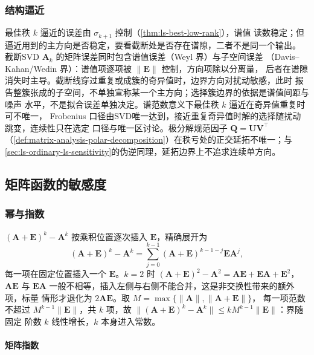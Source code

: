 \subsubsection{结构逼近}
\label{sec:ls-structured-approximation-sensitivity}

最佳秩 $k$ 逼近的误差由 $\sigma_{k+1}$ 控制（\ref{thm:ls-best-low-rank}），谱值
读数稳定；但逼近用到的主方向是否稳定，要看截断处是否存在谱隙，二者不是同一个输出。
截断SVD $\bm A_k$ 的矩阵误差同时包含谱值误差（Weyl 界）与子空间误差
（Davis--Kahan/Wedin 界）：谱值项逐项被 $\lVert\bm E\rVert$ 控制，方向项除以分离量，
后者在谱隙消失时主导。截断线穿过重复或成簇的奇异值时，边界方向对扰动敏感，此时
报告整簇张成的子空间，不单独宣称某一个主方向；选择簇边界的依据是谱值间距与噪声
水平，不是拟合误差单独决定。谱范数意义下最佳秩 $k$ 逼近在奇异值重复时可不唯一，
Frobenius 口径由SVD唯一达到，接近重复奇异值时解的选择随扰动跳变，连续性只在选定
口径与唯一区讨论。极分解规范因子 $\bm Q=\bm U\bm V^\top$
（\ref{def:matrix-analysis-polar-decomposition}）在秩亏处的正交延拓不唯一；与
\ref{sec:ls-ordinary-ls-sensitivity}的伪逆同理，延拓边界上不追求连续单方向。

\subsection{矩阵函数的敏感度}
\label{sec:ls-matrix-function-sensitivity}
\label{sec:linear-algebra-matrix-function-stability}
\label{sec:ch06-matrix-function-stability}

\subsubsection{幂与指数}
\label{sec:ls-powers-exponential-sensitivity}

$(\bm A+\bm E)^k-\bm A^k$ 按乘积位置逐次插入 $\bm E$，精确展开为
\[
 (\bm A+\bm E)^k-\bm A^k
 =\sum_{j=0}^{k-1}(\bm A+\bm E)^{k-1-j}\bm E\bm A^j,
\]
每一项在固定位置插入一个 $\bm E$。$k=2$ 时
$(\bm A+\bm E)^2-\bm A^2=\bm A\bm E+\bm E\bm A+\bm E^2$，$\bm A\bm E$ 与
$\bm E\bm A$ 一般不相等，插入左侧与右侧不能合并，这是非交换性带来的额外项，标量
情形才退化为 $2\bm A\bm E$。取 $M=\max\{\lVert\bm A\rVert,\lVert\bm A+\bm E\rVert\}$，
每一项范数不超过 $M^{k-1}\lVert\bm E\rVert$，共 $k$ 项，故
$\lVert(\bm A+\bm E)^k-\bm A^k\rVert\leq kM^{k-1}\lVert\bm E\rVert$：界随固定
阶数 $k$ 线性增长，$k$ 本身进入常数。

\paragraph{矩阵指数}
\label{sec:ls-matrix-exponential}


